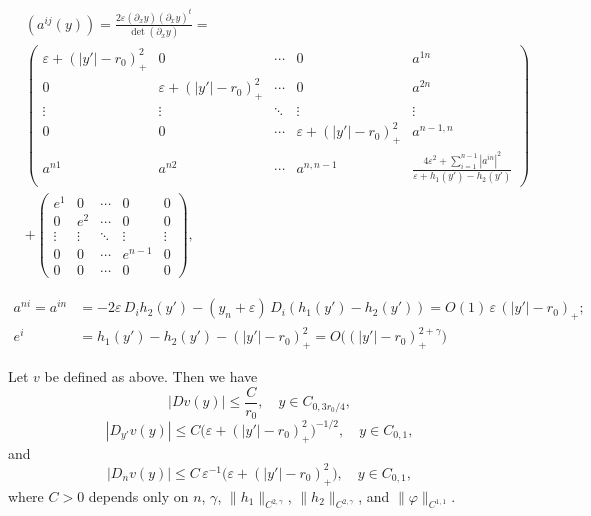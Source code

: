\documentclass[10pt,a4paper]{amsart}
\begin{document}
\begin{align}\label{a_ij_formula}
&(a^{ij}(y)) = \frac{ 2 \varepsilon(\partial_x y)(\partial_x y)^t}{\det (\partial_x y)} =\nonumber\\
& \begin{pmatrix}
\varepsilon + (|y'|-r_0)_+^2 &0 &\cdots &0 &a^{1n}\\
0 &\varepsilon + (|y'|-r_0)_+^2 &\cdots &0 &a^{2n}\\
\vdots &\vdots &\ddots &\vdots &\vdots\\
0 &0 &\cdots &\varepsilon + (|y'|-r_0)_+^2 &a^{n-1,n}\\
a^{n1} &a^{n2} &\cdots &a^{n,n-1} &  \frac{4\varepsilon^2 + \sum_{i=1}^{n-1}|a^{in}|^2}{\varepsilon + h_1(y') - h_2(y')}
\end{pmatrix}\nonumber\\
&+
\begin{pmatrix}
e^1 &0 &\cdots &0 &0\\
0 &e^2 &\cdots &0 &0\\
\vdots &\vdots &\ddots &\vdots &\vdots\\
0 &0 &\cdots & e^{n-1} &0\\
0 &0 &\cdots & 0 &0
\end{pmatrix},
\end{align}

\begin{equation}\label{a_ij_estimate}
\begin{aligned}
a^{ni} = a^{in} &= -2\varepsilon\, D_i h_2(y') - (y_n + \varepsilon)\,D_i(h_1(y') - h_2(y')) = O(1)\, \varepsilon \,(|y'|-r_0)_+;\\
e^{i} &= h_1(y')-h_2(y')-(|y'|-r_0)_+^2 = O\Big( (|y'|-r_0)_+^{2+\gamma} \Big)
\end{aligned}
\end{equation}

\begin{lemma}%
Let $v$ be defined as above. Then we have
\begin{equation}\label{Dv_uniform_bound}
|Dv(y)| \le \frac{C}{r_0} , \quad y \in C_{0,3r_0/4},
\end{equation}
\begin{equation}\label{D'v-bound}
|D_{y'} v(y)| \le C \big(\varepsilon + (|y'|-r_0)_+^2 \big)^{-1/2}, \quad y \in C_{0,1},
\end{equation}
and
\begin{equation}\label{Dnv-bound}
|D_{n} v(y)| \le C\,\varepsilon^{-1}\big(\varepsilon+(|y'|-r_0)_+^2\big),  \quad y \in C_{0,1},  
\end{equation}
where $C>0$ depends only on $n$, $\gamma$, $\|h_1\|_{C^{2,\gamma}}$, $\|h_2\|_{C^{2,\gamma}}$, and $\|\varphi\|_{C^{1,1}}$.
\end{lemma}
\end{document}
